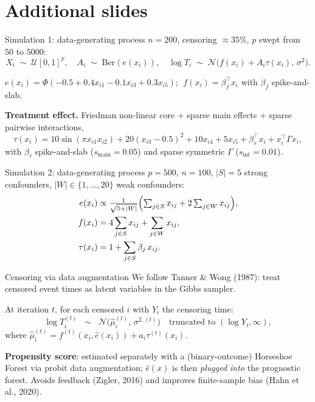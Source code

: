 \documentclass[10pt,aspectratio=169]{beamer}
\newcommand{\N}{\mathcal{N}}
\begin{document}
\section{Additional slides}


\begin{frame}{Simulation 1: data-generating process}
$n = 200$, censoring $\approx 35\%$, $p$ swept from $50$ to $5000$:
\[
X_i \;\sim\; \mathcal{U}[0,1]^p, \quad A_i \;\sim\; \mathrm{Ber}(e(x_i)), \quad \log T_i \;\sim\; \N\bigl(f(x_i) + A_i\tau(x_i),\, \sigma^2\bigr).
\]

\smallskip

$e(x_i) = \Phi(-0.5 + 0.4 x_{i1} - 0.1 x_{i3} + 0.3 x_{i5})$; $\;f(x_i) = \beta_f^\top x_i$ with $\beta_f$ spike-and-slab.

\smallskip

\textbf{Treatment effect.} Friedman non-linear core $+$ sparse main effects $+$ sparse pairwise interactions,
\[
\tau(x_i) = 10\sin(\pi x_{i1} x_{i2}) + 20(x_{i3}-0.5)^2 + 10 x_{i4} + 5 x_{i5} + \beta_\tau^\top x_i + x_i^\top \Gamma x_i,
\]
with $\beta_\tau$ spike-and-slab ($s_{\mathrm{main}} = 0.05$) and sparse symmetric $\Gamma$ ($s_{\mathrm{int}} = 0.01$).
\end{frame}

\begin{frame}{Simulation 2: data-generating process}
$p = 500$, $n = 100$, $|S|=5$ strong confounders, $|W| \in \{1,\ldots,20\}$ weak confounders:
\begin{align*}
e(x_i)    &\propto \tfrac{1}{\sqrt{5+|W|}}\Bigl(\textstyle\sum_{j\in S} x_{ij} + 2 \sum_{j \in W} x_{ij}\Bigr), \\
f(x_i)    &= 4 \sum_{j\in S} x_{ij} + \sum_{j\in W} x_{ij}, \\
\tau(x_i) &= 1 + \sum_{j \in S} \beta_j\, x_{ij}.
\end{align*}
\end{frame}

\begin{frame}{Censoring via data augmentation}
We follow Tanner \& Wong (1987): treat censored event times as latent variables in the Gibbs sampler.

\bigskip

At iteration $t$, for each censored $i$ with $Y_i$ the censoring time:
\[
\log T_i^{(t)} \;\;\sim\;\; \N\bigl(\hat\mu_i^{(t)},\, \sigma^{2,(t)}\bigr) \quad \text{truncated to } (\log Y_i, \infty),
\]
where $\hat\mu_i^{(t)} = f^{(t)}(x_i, \hat e(x_i)) + a_i \tau^{(t)}(x_i)$.

\bigskip

\textbf{Propensity score}: estimated separately with a (binary-outcome) Horseshoe Forest via probit data augmentation; $\hat e(x)$ is then \emph{plugged into} the prognostic forest. Avoids feedback (Zigler, 2016) and improves finite-sample bias (Hahn et al., 2020).
\end{frame}
\end{document}
